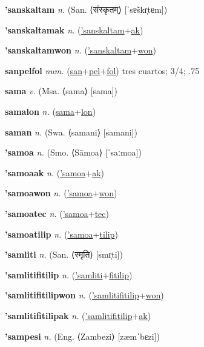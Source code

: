 \textbf{\hypertarget{'sanskaltam}{'sanskaltam}} \textit{n.} (San. ⟨{\devanagari{}संस्कृतम्}⟩ [ˈsɐ̃skr̩tɐm])


\textbf{\hypertarget{'sanskaltamak}{'sanskaltamak}} \textit{n.} (\hyperlink{'sanskaltam}{'sanskaltam}+\allowbreak \hyperlink{ak}{ak})


\textbf{\hypertarget{'sanskaltamwon}{'sanskaltamwon}} \textit{n.} (\hyperlink{'sanskaltam}{'sanskaltam}+\allowbreak \hyperlink{won}{won})


\textbf{\hypertarget{sanpelfol}{sanpelfol}} \textit{num.} (\hyperlink{san}{san}+\allowbreak \hyperlink{pel}{pel}+\allowbreak \hyperlink{fol}{fol})
tres cuartos; 3/4; .75

\textbf{\hypertarget{sama}{sama}} \textit{v.} (Msa. ⟨sama⟩ [sama])


\textbf{\hypertarget{samalon}{samalon}} \textit{n.} (\hyperlink{sama}{sama}+\allowbreak \hyperlink{lon}{lon})


\textbf{\hypertarget{saman}{saman}} \textit{n.} (Swa. ⟨samani⟩ [samani])


\textbf{\hypertarget{'samoa}{'samoa}} \textit{n.} (Smo. ⟨Sāmoa⟩ [ˈsaːmoa])


\textbf{\hypertarget{'samoaak}{'samoaak}} \textit{n.} (\hyperlink{'samoa}{'samoa}+\allowbreak \hyperlink{ak}{ak})


\textbf{\hypertarget{'samoawon}{'samoawon}} \textit{n.} (\hyperlink{'samoa}{'samoa}+\allowbreak \hyperlink{won}{won})


\textbf{\hypertarget{'samoatec}{'samoatec}} \textit{n.} (\hyperlink{'samoa}{'samoa}+\allowbreak \hyperlink{tec}{tec})


\textbf{\hypertarget{'samoatilip}{'samoatilip}} \textit{n.} (\hyperlink{'samoa}{'samoa}+\allowbreak \hyperlink{tilip}{tilip})


\textbf{\hypertarget{'samliti}{'samliti}} \textit{n.} (San. ⟨{\devanagari{}स्मृति}⟩ [smr̩ti])


\textbf{\hypertarget{'samlitifitilip}{'samlitifitilip}} \textit{n.} (\hyperlink{'samliti}{'samliti}+\allowbreak \hyperlink{fitilip}{fitilip})


\textbf{\hypertarget{'samlitifitilipwon}{'samlitifitilipwon}} \textit{n.} (\hyperlink{'samlitifitilip}{'samlitifitilip}+\allowbreak \hyperlink{won}{won})


\textbf{\hypertarget{'samlitifitilipak}{'samlitifitilipak}} \textit{n.} (\hyperlink{'samlitifitilip}{'samlitifitilip}+\allowbreak \hyperlink{ak}{ak})


\textbf{\hypertarget{'sampesi}{'sampesi}} \textit{n.} (Eng. ⟨Zambezi⟩ [zæmˈbɛzi])


